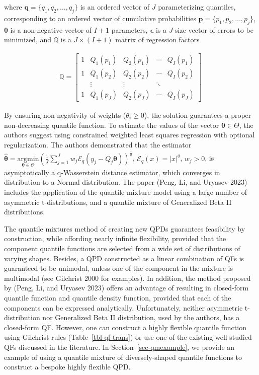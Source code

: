 \documentclass[
]{interact}
\begin{document}
where \(\mathbf{q}=\{q_1,q_2,\dots, q_j\}\) is an ordered vector of
\(J\) parameterizing quantiles, corresponding to an ordered vector of
cumulative probabilities \(\mathbf{p}=\{p_1,p_2,\dots, p_j\}\),
\(\pmb\theta\) is a non-negative vector of \(I+1\) parameters,
\(\pmb\epsilon\) is a \(J\)-size vector of errors to be minimized, and
\(\mathbb Q\) is a \(J\times(I+1)\) matrix of regression factors

\[
\begin{gathered}
\mathbb{Q} = \left[\begin{array}{lllll}
1  &Q_1(p_1) &Q_2(p_1) &\cdots &Q_I(p_1)\\
1  &Q_1(p_2) &Q_2(p_2) &\cdots &Q_I(p_2)\\
   &\vdots   &\vdots   &\ddots \\
1  &Q_1(p_J) &Q_2(p_J) &\cdots &Q_I(p_J)
\end{array}\right]
\end{gathered}
\]

By ensuring non-negativity of weights (\(\theta_i\geq0\)), the solution
guarantees a proper non-decreasing quantile function. To estimate the
values of the vector \(\pmb\theta\in\Theta\), the authors suggest using
constrained weighted least squares regression with optional
regularization. The authors demonstrated that the estimator
\(\widehat{\pmb\theta}=\underset{\pmb\theta\in\Theta}{\text{argmin}} \left(\frac{1}{J}\sum_{j=1}^Jw_j\mathcal{E}_q(y_j-Q_j\pmb\theta)\right)^{\frac{1}{q}}\),
\(\mathcal{E}_q(x)=\lvert x \rvert^q\), \(w_j>0\), is asymptotically a
q-Wasserstein distance estimator, which converges in distribution to a
Normal distribution. The paper (Peng, Li, and Uryasev 2023) includes the
application of the quantile mixture model using a large number of
asymmetric t-distributions, and a quantile mixture of Generalized Beta
II distributions.

The quantile mixtures method of creating new QPDs guarantees feasibility
by construction, while affording nearly infinite flexibility, provided
that the component quantile functions are selected from a wide set of
distributions of varying shapes. Besides, a QPD constructed as a linear
combination of QFs is guaranteed to be unimodal, unless one of the
component in the mixture is multimodal (see Gilchrist 2000 for
examples). In addition, the method proposed by (Peng, Li, and Uryasev
2023) offers an advantage of resulting in closed-form quantile function
and quantile density function, provided that each of the components can
be expressed analytically. Unfortunately, neither asymmetric
t-distribution nor Generalized Beta II distribution, used by the
authors, has a closed-form QF. However, one can construct a highly
flexible quantile function using Gilchrist rules
(Table~\ref{tbl-qf-trans}) or use one of the existing well-studied QFs
discussed in the literature. In Section~\ref{sec-qmexample}, we provide
an example of using a quantile mixture of diversely-shaped quantile
functions to construct a bespoke highly flexible QPD.
\end{document}
